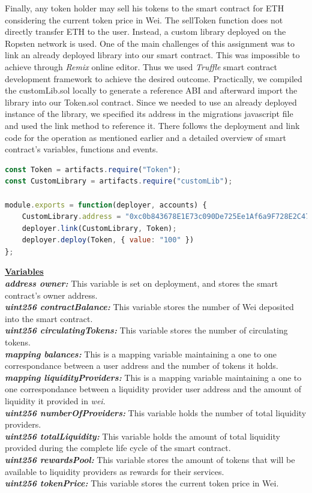 \documentclass[12pt,a4paper]{article}
\begin{document}
Finally, any token holder may sell his tokens to the smart contract for ETH
considering the current token price in Wei. The sellToken function does not
directly transfer ETH to the user. Instead, a custom library deployed on the
Ropsten network is used. One of the main challenges of this assignment was to
link an already deployed library into our smart contract. This was impossible to
achieve through \emph{Remix} online editor. Thus we used \emph{Truffle} smart contract
development framework to achieve the desired outcome. Practically, we compiled
the customLib.sol locally to generate a reference ABI and afterward import the
library into our Token.sol contract. Since we needed to use an already deployed
instance of the library, we specified its address in the migrations javascript
file and used the link method to reference it. There follows the deployment and
link code for the operation as mentioned earlier and a detailed overview of smart
contract's variables, functions and events. \\

\pagebreak

\begin{lstlisting}[language=JavaScript]
const Token = artifacts.require("Token");
const CustomLibrary = artifacts.require("customLib");

module.exports = function(deployer, accounts) {
    CustomLibrary.address = "0xc0b843678E1E73c090De725Ee1Af6a9F728E2C47"
    deployer.link(CustomLibrary, Token);
    deployer.deploy(Token, { value: "100" })
};
\end{lstlisting}

\textbf{\underline{Variables}} \\
\textbf{\emph{address owner:}} This variable is set on deployment, and stores the smart
contract's owner address.\\
\textbf{\emph{uint256 contractBalance:}} This variable stores the number of Wei deposited
into the smart contract.\\
\textbf{\emph{uint256 circulatingTokens:}}  This variable stores the number of
circulating tokens.\\
\textbf{\emph{mapping balances:}} This is a mapping variable maintaining a one to one
correspondance between a user address and the number of tokens it holds. \\
\textbf{\emph{mapping liquidityProviders:}} This is a mapping variable maintaining a one
to one correspondance between a liquidity provider user address and the amount
of liquidity it provided in \emph{wei}. \\
\textbf{\emph{uint256 numberOfProviders:}} This variable holds the number of total
liquidity providers.\\
\textbf{\emph{uint256 totalLiquidity:}} This variable holds the amount of total liquidity
provided during the complete life cycle of the smart contract.\\
\textbf{\emph{uint256 rewardsPool:}} This variable stores the amount of tokens that will
be available to liquidity providers as rewards for their services.\\
\textbf{\emph{uint256 tokenPrice:}} This variable stores the current token price in Wei.\\
\end{document}
